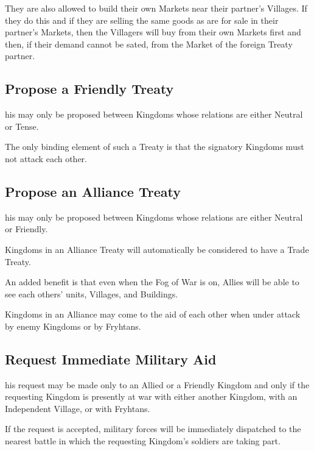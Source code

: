 They are also allowed to build their own Markets near their partner’s Villages. If they do this and if they are selling the same goods as are for sale in their partner’s Markets, then the Villagers will buy from their own Markets first and then, if their demand cannot be sated, from the Market of the foreign Treaty partner.

\subsection{\textsf{Propose a Friendly Treaty}}


his may only be proposed between Kingdoms whose relations are either Neutral or Tense.

The only binding element of such a Treaty is that the signatory Kingdoms must not attack each other.

\subsection{\textsf{Propose an Alliance Treaty}}


his may only be proposed between Kingdoms whose relations are either Neutral or Friendly.

Kingdoms in an Alliance Treaty will automatically be considered to have a Trade Treaty.

An added benefit is that even when the Fog of War is on, Allies will be able to see each others’ units, Villages, and Buildings.

Kingdoms in an Alliance may come to the aid of each other when under attack by enemy Kingdoms or by Fryhtans.

\subsection{\textsf{Request Immediate Military Aid}}


his request may be made only to an Allied or a Friendly Kingdom and only if the requesting Kingdom is presently at war with either another Kingdom, with an Independent Village, or with Fryhtans.

If the request is accepted, military forces will be immediately dispatched to the nearest battle in which the requesting Kingdom’s soldiers are taking part.

